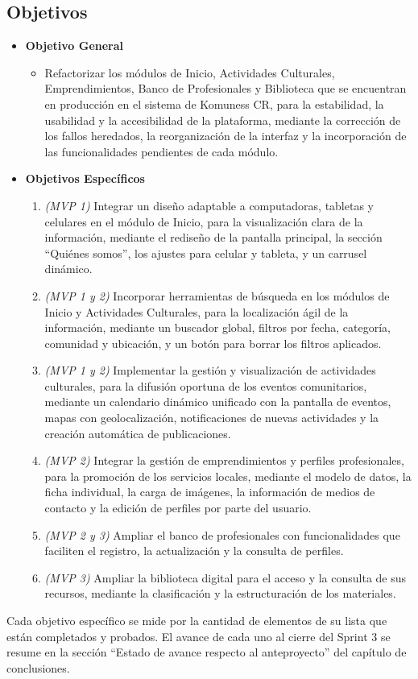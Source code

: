\subsection{Objetivos}

\begin{itemize}
    \item \textbf{Objetivo General}
    \begin{itemize}
        \item Refactorizar los módulos de Inicio, Actividades Culturales, Emprendimientos, Banco de Profesionales y Biblioteca que se encuentran en producción en el sistema de Komuness CR, para la estabilidad, la usabilidad y la accesibilidad de la plataforma, mediante la corrección de los fallos heredados, la reorganización de la interfaz y la incorporación de las funcionalidades pendientes de cada módulo.
    \end{itemize}
    \item \textbf{Objetivos Específicos}
    \begin{enumerate}
        \item \textit{(MVP 1)} Integrar un diseño adaptable a computadoras, tabletas y celulares en el módulo de Inicio, para la visualización clara de la información, mediante el rediseño de la pantalla principal, la sección ``Quiénes somos'', los ajustes para celular y tableta, y un carrusel dinámico.
        \item \textit{(MVP 1 y 2)} Incorporar herramientas de búsqueda en los módulos de Inicio y Actividades Culturales, para la localización ágil de la información, mediante un buscador global, filtros por fecha, categoría, comunidad y ubicación, y un botón para borrar los filtros aplicados.
        \item \textit{(MVP 1 y 2)} Implementar la gestión y visualización de actividades culturales, para la difusión oportuna de los eventos comunitarios, mediante un calendario dinámico unificado con la pantalla de eventos, mapas con geolocalización, notificaciones de nuevas actividades y la creación automática de publicaciones.
        \item \textit{(MVP 2)} Integrar la gestión de emprendimientos y perfiles profesionales, para la promoción de los servicios locales, mediante el modelo de datos, la ficha individual, la carga de imágenes, la información de medios de contacto y la edición de perfiles por parte del usuario.
        \item \textit{(MVP 2 y 3)} Ampliar el banco de profesionales con funcionalidades que faciliten el registro, la actualización y la consulta de perfiles.
        \item \textit{(MVP 3)} Ampliar la biblioteca digital para el acceso y la consulta de sus recursos, mediante la clasificación y la estructuración de los materiales.
    \end{enumerate}
\end{itemize}
Cada objetivo específico se mide por la cantidad de elementos de su lista que están completados y probados. El avance de cada uno al cierre del Sprint 3 se resume en la sección ``Estado de avance respecto al anteproyecto'' del capítulo de conclusiones.

